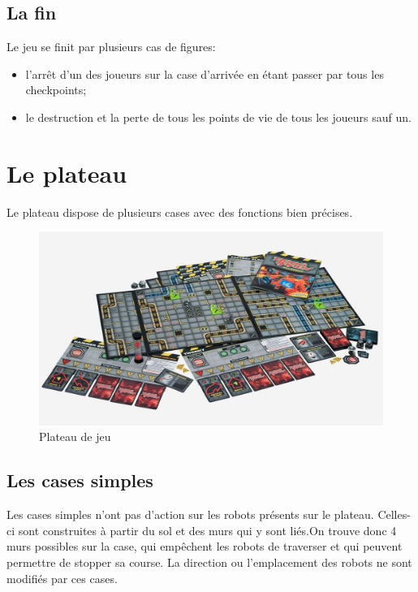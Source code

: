 \documentclass[a4paper,12pt]{report}
\begin{document}
		\subsection{La fin}

Le jeu se finit par plusieurs cas de figures:
\begin{itemize}
\item l'arrêt d'un des joueurs sur la case d'arrivée en étant passer par tous les checkpoints;
\item le destruction et la perte de tous les points de vie de tous les joueurs sauf un.
\end{itemize}
   	\section{Le plateau}

Le plateau dispose de plusieurs cases avec des fonctions bien précises.

\begin{figure}[!ht]
\center
\includegraphics[scale = 0.3]{Images/plateau}
\caption{Plateau de jeu}

\end{figure}

    		\subsection{Les cases simples}

Les cases simples n'ont pas d'action sur les robots présents sur le plateau. Celles-ci sont construites à partir du sol et des murs qui y sont liés.On trouve donc 4 murs possibles sur la case, qui empêchent les robots de traverser et qui peuvent permettre de stopper sa course. La direction ou l'emplacement des robots ne sont modifiés par ces cases.
\end{document}
